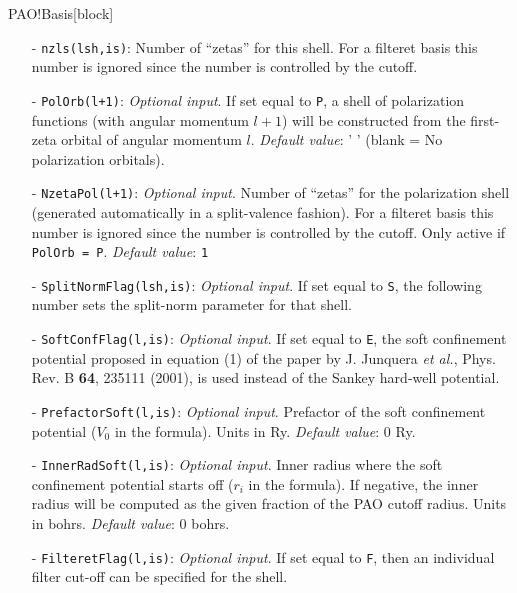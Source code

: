 \begin{fdfentry}{PAO!Basis}[block]
\begin{itemize}
    \item[-]%
    \texttt{nzls(lsh,is)}: Number of ``zetas'' for this shell. For a
    filteret basis this number is ignored since the number is
    controlled by the cutoff.

    \item[-]%
    \texttt{PolOrb(l+1)}: \textit{Optional input}. If set equal to
    \texttt{P}, a shell of polarization functions (with angular
    momentum $l+1$) will be constructed from the first-zeta orbital of
    angular momentum $l$. \textit{Default value}: ' ' (blank = No
    polarization orbitals).

    \item[-]%
    \texttt{NzetaPol(l+1)}: \textit{Optional input}. Number of
    ``zetas'' for the polarization shell (generated automatically in a
    split-valence fashion).  For a filteret basis this number is
    ignored since the number is controlled by the cutoff.  Only active
    if \texttt{PolOrb = P}. \textit{Default value}: \texttt{1}

    \item[-]%
    \texttt{SplitNormFlag(lsh,is)}:
    \textit{Optional input}. If set equal to \texttt{S}, the following
    number sets the split-norm parameter for that shell.

    \item[-]%
    \texttt{SoftConfFlag(l,is)}: \textit{Optional input}. If set equal to
    \texttt{E}, the soft confinement potential proposed in equation
    (1) of the paper by J. Junquera \textit{et al.}, Phys. Rev. B
    \textbf{64}, 235111 (2001), is used instead of the Sankey
    hard-well potential.

    \item[-]%
    \texttt{PrefactorSoft(l,is)}: \textit{Optional input}. Prefactor
    of the soft confinement potential ($V_{0}$ in the formula). Units
    in Ry.  \textit{Default value}: 0 Ry.

    \item[-]%
    \texttt{InnerRadSoft(l,is)}: \textit{Optional input}. Inner radius
    where the soft confinement potential starts off ($r_{i}$ in the
    formula).  If negative, the inner radius will be computed as the
    given fraction of the PAO cutoff radius.  Units in
    bohrs. \textit{Default value}: 0 bohrs.

    \item[-]%
    \texttt{FilteretFlag(l,is)}:
    \textit{Optional input}. If set equal to \texttt{F}, then an
    individual filter cut-off can be specified for the shell.


\end{itemize}
\end{fdfentry}
